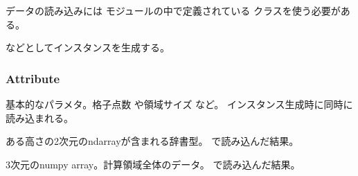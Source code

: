 \documentclass[letterpaper,10pt,dvipdfmx,report]{sphinxmanual}
\begin{document}
データの読み込みには  モジュールの中で定義されている  クラスを使う必要がある。

\begin{sphinxVerbatim}[commandchars=\\\{\}]
 
  
  
\end{sphinxVerbatim}

などとしてインスタンスを生成する。


\subsubsection{Attribute}
\label{\detokenize{io:attribute}}

\begin{fulllineitems}
\label{\detokenize{io:R2D2.R2D2_data.p}}
基本的なパラメタ。格子点数  や領域サイズ  など。
インスタンス生成時に同時に読み込まれる。

\end{fulllineitems}


\begin{fulllineitems}
\label{\detokenize{io:R2D2.R2D2_data.qs}}
ある高さの2次元のndarrayが含まれる辞書型。 {\hyperref[\detokenize{io:R2D2.R2D2_data.read_qq_select}]{}} で読み込んだ結果。

\end{fulllineitems}


\begin{fulllineitems}
\label{\detokenize{io:R2D2.R2D2_data.qq}}
3次元のnumpy array。計算領域全体のデータ。{\hyperref[\detokenize{io:R2D2.R2D2_data.read_qq}]{}} で読み込んだ結果。

\end{fulllineitems}
\end{document}
